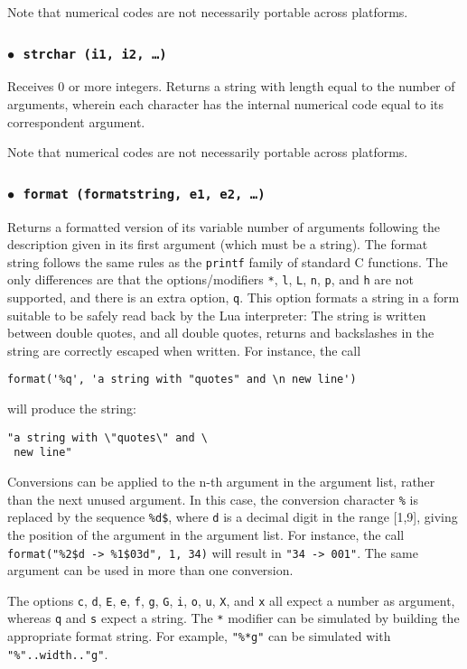 \documentclass[11pt]{article}
\newcommand{\T}[1]{{\tt #1}}
\newcommand{\Deffunc}[1]{\index{#1}}
\newcommand{\ff}{$\bullet$\ }
\begin{document}
Note that numerical codes are not necessarily portable across platforms.

\subsubsection*{\ff \T{strchar (i1, i2, \ldots)}}\Deffunc{strchar}
Receives 0 or more integers.
Returns a string with length equal to the number of arguments,
wherein each character has the internal numerical code equal
to its correspondent argument.

Note that numerical codes are not necessarily portable across platforms.

\subsubsection*{\ff \T{format (formatstring, e1, e2, \ldots)}}\Deffunc{format}
\label{format}
Returns a formatted version of its variable number of arguments
following the description given in its first argument (which must be a string).
The format string follows the same rules as the \verb|printf| family of
standard C functions.
The only differences are that the options/modifiers
\verb|*|, \verb|l|, \verb|L|, \verb|n|, \verb|p|,
and \verb|h| are not supported,
and there is an extra option, \verb|q|.
This option formats a string in a form suitable to be safely read
back by the Lua interpreter:
The string is written between double quotes,
and all double quotes, returns and backslashes in the string
are correctly escaped when written.
For instance, the call
\begin{verbatim}
format('%q', 'a string with "quotes" and \n new line')
\end{verbatim}
will produce the string:
\begin{verbatim}
"a string with \"quotes\" and \
 new line"
\end{verbatim}

Conversions can be applied to the n-th argument in the argument list,
rather than the next unused argument.
In this case, the conversion character \verb|%| is replaced
by the sequence \verb|%d$|, where \verb|d| is a
decimal digit in the range [1,9],
giving the position of the argument in the argument list.
For instance, the call \verb|format("%2$d -> %1$03d", 1, 34)| will
result in \verb|"34 -> 001"|.
The same argument can be used in more than one conversion.

The options \verb|c|, \verb|d|, \verb|E|, \verb|e|, \verb|f|,
\verb|g|, \verb|G|, \verb|i|, \verb|o|, \verb|u|, \verb|X|, and \verb|x| all
expect a number as argument,
whereas \verb|q| and \verb|s| expect a string.
The \verb|*| modifier can be simulated by building
the appropriate format string.
For example, \verb|"%*g"| can be simulated with
\verb|"%"..width.."g"|.
\end{document}
